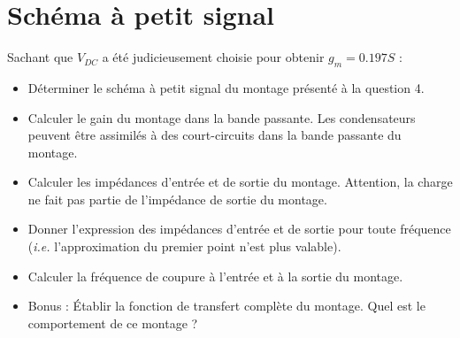 \documentclass{../template/tp}
\newcommand{\ifgv}[1]{\ifthenelse{\boolean{corrige}}{}{#1}} %
\begin{document}
\ifgv{\newpage}


\section{Schéma à petit signal}

\Question
{
Sachant que $V_{DC}$ a été judicieusement choisie pour obtenir $g_m=0.197S$ :
 
 \begin{itemize}
 \item Déterminer le schéma à petit signal du montage présenté à la question 4.
 \item Calculer le gain du montage dans la bande passante. Les condensateurs peuvent être assimilés à des court-circuits dans la bande passante du montage.
 \item Calculer les impédances d'entrée et de sortie du montage. Attention, la charge ne fait pas partie de l'impédance de sortie du montage.
 \item Donner l'expression des impédances d'entrée et de sortie pour toute fréquence (\textit{i.e.} l'approximation du premier point n'est plus valable).
 \item Calculer la fréquence de coupure à l'entrée et à la sortie du montage.
 \item Bonus : Établir la fonction de transfert complète du montage. Quel est le comportement de ce montage ?
 \end{itemize}

}
\end{document}
